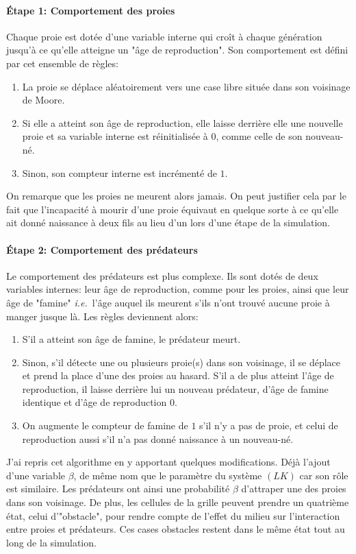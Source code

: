 \documentclass[11pt]{article}
\newcommand{\ie}{\textsl{i.e.}\ }
\begin{document}
\paragraph{Étape 1: Comportement des proies}
Chaque proie est dotée d'une variable interne qui croît à chaque génération jusqu'à ce qu'elle atteigne un "âge de reproduction". Son comportement est défini par cet ensemble de règles:
\begin{enumerate}
    \item La proie se déplace aléatoirement vers une case libre située dans son voisinage de Moore.
    \item Si elle a atteint son âge de reproduction, elle laisse derrière elle une nouvelle proie et sa variable interne est réinitialisée à $0$, comme celle de son nouveau-né.
    \item Sinon, son compteur interne est incrémenté de $1$.
\end{enumerate}
On remarque que les proies ne meurent alors jamais. On peut justifier cela par le fait que l'incapacité à mourir d'une proie équivaut en quelque sorte à ce qu'elle ait donné naissance à deux fils au lieu d'un lors d'une étape de la simulation.

\paragraph{Étape 2: Comportement des prédateurs}
Le comportement des prédateurs est plus complexe. Ils sont dotés de deux variables internes: leur âge de reproduction, comme pour les proies, ainsi que leur âge de "famine" \ie l'âge auquel ils meurent s'ils n'ont trouvé aucune proie à manger jusque là. Les règles deviennent alors:
\begin{enumerate}
    \item S'il a atteint son âge de famine, le prédateur meurt.
    \item Sinon, s'il détecte une ou plusieurs proie(s) dans son voisinage, il se déplace et prend la place d'une des proies au hasard. S'il a de plus atteint l'âge de reproduction, il laisse derrière lui un nouveau prédateur, d'âge de famine identique et d'âge de reproduction $0$.
    \item On augmente le compteur de famine de $1$ s'il n'y a pas de proie, et celui de reproduction aussi s'il n'a pas donné naissance à un nouveau-né.
\end{enumerate}

J'ai repris cet algorithme en y apportant quelques modifications. Déjà l'ajout d'une variable $\beta$, de même nom que le paramètre du système $(LK)$ car son rôle est similaire. Les prédateurs ont ainsi une probabilité $\beta$ d'attraper une des proies dans son voisinage. De plus, les cellules de la grille peuvent prendre un quatrième état, celui d'"obstacle", pour rendre compte de l'effet du milieu sur l'interaction entre proies et prédateurs. Ces cases obstacles restent dans le même état tout au long de la simulation.
\end{document}

